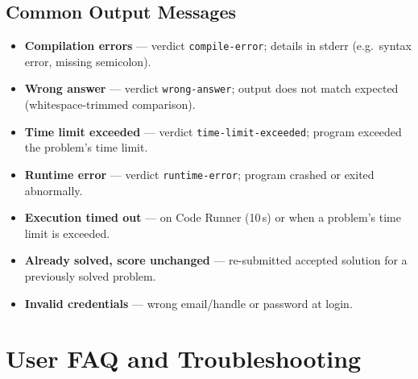 \documentclass[11pt,a4paper]{article}
\begin{document}
\subsection{Common Output Messages}
\begin{itemize}[noitemsep]
  \item \textbf{Compilation errors} --- verdict \texttt{compile-error}; details in stderr (e.g.\ syntax error, missing semicolon).
  \item \textbf{Wrong answer} --- verdict \texttt{wrong-answer}; output does not match expected (whitespace-trimmed comparison).
  \item \textbf{Time limit exceeded} --- verdict \texttt{time-limit-exceeded}; program exceeded the problem's time limit.
  \item \textbf{Runtime error} --- verdict \texttt{runtime-error}; program crashed or exited abnormally.
  \item \textbf{Execution timed out} --- on Code Runner (10\,s) or when a problem's time limit is exceeded.
  \item \textbf{Already solved, score unchanged} --- re-submitted accepted solution for a previously solved problem.
  \item \textbf{Invalid credentials} --- wrong email/handle or password at login.
\end{itemize}

\section{User FAQ and Troubleshooting}
\end{document}
